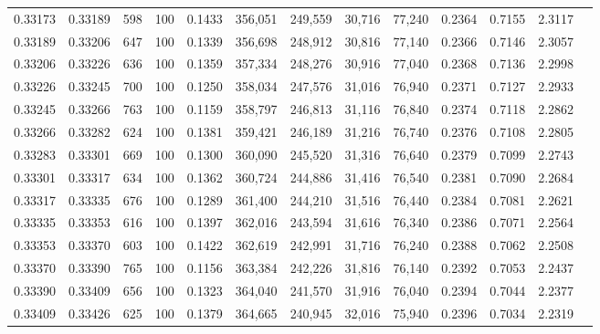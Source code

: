 \begin{tabular}{rrrrrrrrrrrrr}
0.33173 & 0.33189 &   598 & 100 &                                     0.1433 & 356,051 & 249,559 &  30,716 &  77,240 & 0.2364 & 0.7155 & 2.3117 \\
0.33189 & 0.33206 &   647 & 100 &                                     0.1339 & 356,698 & 248,912 &  30,816 &  77,140 & 0.2366 & 0.7146 & 2.3057 \\
0.33206 & 0.33226 &   636 & 100 &                                     0.1359 & 357,334 & 248,276 &  30,916 &  77,040 & 0.2368 & 0.7136 & 2.2998 \\
0.33226 & 0.33245 &   700 & 100 &                                     0.1250 & 358,034 & 247,576 &  31,016 &  76,940 & 0.2371 & 0.7127 & 2.2933 \\
0.33245 & 0.33266 &   763 & 100 &                                     0.1159 & 358,797 & 246,813 &  31,116 &  76,840 & 0.2374 & 0.7118 & 2.2862 \\
0.33266 & 0.33282 &   624 & 100 &                                     0.1381 & 359,421 & 246,189 &  31,216 &  76,740 & 0.2376 & 0.7108 & 2.2805 \\
0.33283 & 0.33301 &   669 & 100 &                                     0.1300 & 360,090 & 245,520 &  31,316 &  76,640 & 0.2379 & 0.7099 & 2.2743 \\
0.33301 & 0.33317 &   634 & 100 &                                     0.1362 & 360,724 & 244,886 &  31,416 &  76,540 & 0.2381 & 0.7090 & 2.2684 \\
0.33317 & 0.33335 &   676 & 100 &                                     0.1289 & 361,400 & 244,210 &  31,516 &  76,440 & 0.2384 & 0.7081 & 2.2621 \\
0.33335 & 0.33353 &   616 & 100 &                                     0.1397 & 362,016 & 243,594 &  31,616 &  76,340 & 0.2386 & 0.7071 & 2.2564 \\
0.33353 & 0.33370 &   603 & 100 &                                     0.1422 & 362,619 & 242,991 &  31,716 &  76,240 & 0.2388 & 0.7062 & 2.2508 \\
0.33370 & 0.33390 &   765 & 100 &                                     0.1156 & 363,384 & 242,226 &  31,816 &  76,140 & 0.2392 & 0.7053 & 2.2437 \\
0.33390 & 0.33409 &   656 & 100 &                                     0.1323 & 364,040 & 241,570 &  31,916 &  76,040 & 0.2394 & 0.7044 & 2.2377 \\
0.33409 & 0.33426 &   625 & 100 &                                     0.1379 & 364,665 & 240,945 &  32,016 &  75,940 & 0.2396 & 0.7034 & 2.2319 \\

\end{tabular}

